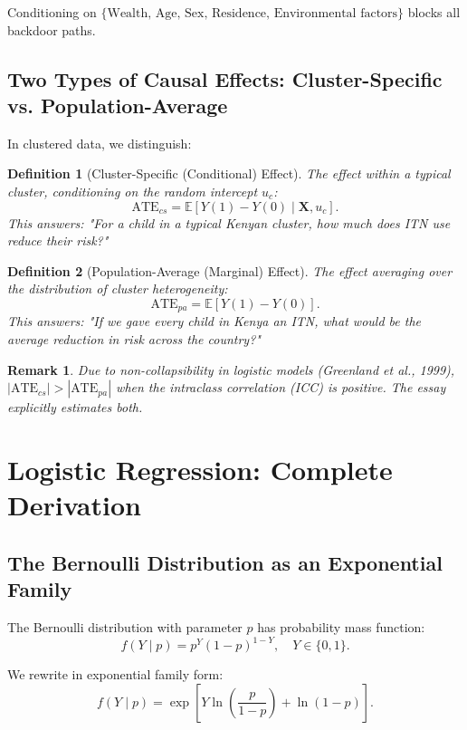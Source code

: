 \documentclass[12pt]{article}
\numberwithin{equation}{section}
\newtheorem{definition}{Definition}[section]
\newtheorem{remark}{Remark}[section]
\begin{document}
	Conditioning on $\{\text{Wealth, Age, Sex, Residence, Environmental factors}\}$ blocks all backdoor paths.
	
	\subsection{Two Types of Causal Effects: Cluster-Specific vs. Population-Average}
	
	In clustered data, we distinguish:
	
	\begin{definition}[Cluster-Specific (Conditional) Effect]
		The effect within a typical cluster, conditioning on the random intercept $u_c$:
		\[
		\text{ATE}_{cs} = \mathbb{E}[Y(1) - Y(0) \mid \mathbf{X}, u_c].
		\]
		This answers: "For a child in a typical Kenyan cluster, how much does ITN use reduce their risk?"
	\end{definition}
	
	\begin{definition}[Population-Average (Marginal) Effect]
		The effect averaging over the distribution of cluster heterogeneity:
		\[
		\text{ATE}_{pa} = \mathbb{E}[Y(1) - Y(0)].
		\]
		This answers: "If we gave every child in Kenya an ITN, what would be the average reduction in risk across the country?"
	\end{definition}
	
	\begin{remark}
		Due to non-collapsibility in logistic models (Greenland et al., 1999), $|\text{ATE}_{cs}| > |\text{ATE}_{pa}|$ when the intraclass correlation (ICC) is positive. The essay explicitly estimates both.
	\end{remark}
	
	\section{Logistic Regression: Complete Derivation}
	
	\subsection{The Bernoulli Distribution as an Exponential Family}
	
	The Bernoulli distribution with parameter $p$ has probability mass function:
	\[
	f(Y \mid p) = p^Y (1-p)^{1-Y}, \quad Y \in \{0,1\}.
	\]
	
	We rewrite in exponential family form:
	\[
	f(Y \mid p) = \exp\left[ Y \ln\left(\frac{p}{1-p}\right) + \ln(1-p) \right].
	\]
	
\end{document}

